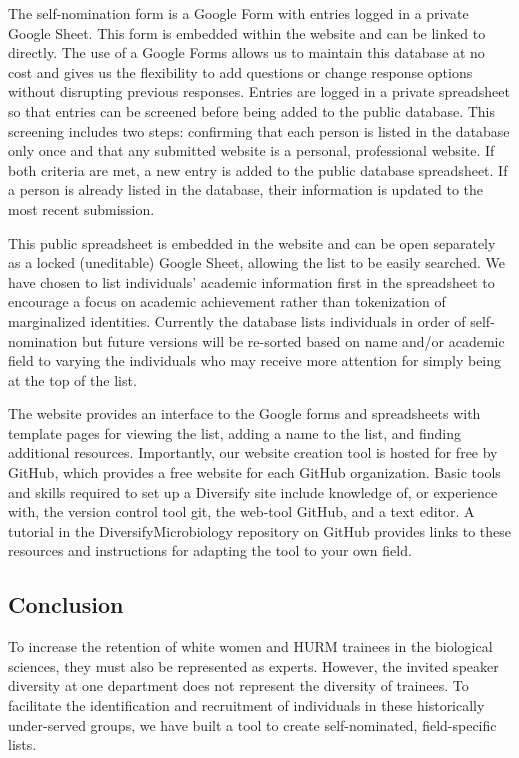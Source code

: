 \documentclass[10pt,]{article}
\begin{document}
The self-nomination form is a Google Form with entries logged in a
private Google Sheet. This form is embedded within the website and can
be linked to directly. The use of a Google Forms allows us to maintain
this database at no cost and gives us the flexibility to add questions
or change response options without disrupting previous responses.
Entries are logged in a private spreadsheet so that entries can be
screened before being added to the public database. This screening
includes two steps: confirming that each person is listed in the
database only once and that any submitted website is a personal,
professional website. If both criteria are met, a new entry is added to
the public database spreadsheet. If a person is already listed in the
database, their information is updated to the most recent submission.

This public spreadsheet is embedded in the website and can be open
separately as a locked (uneditable) Google Sheet, allowing the list to
be easily searched. We have chosen to list individuals' academic
information first in the spreadsheet to encourage a focus on academic
achievement rather than tokenization of marginalized identities.
Currently the database lists individuals in order of self-nomination but
future versions will be re-sorted based on name and/or academic field to
varying the individuals who may receive more attention for simply being
at the top of the list.

The website provides an interface to the Google forms and spreadsheets
with template pages for viewing the list, adding a name to the list, and
finding additional resources. Importantly, our website creation tool is
hosted for free by GitHub, which provides a free website for each GitHub
organization. Basic tools and skills required to set up a Diversify site
include knowledge of, or experience with, the version control tool git,
the web-tool GitHub, and a text editor. A tutorial in the
DiversifyMicrobiology repository on GitHub provides links to these
resources and instructions for adapting the tool to your own field.

\subsection{Conclusion}\label{conclusion}

To increase the retention of white women and HURM trainees in the
biological sciences, they must also be represented as experts. However,
the invited speaker diversity at one department does not represent the
diversity of trainees. To facilitate the identification and recruitment
of individuals in these historically under-served groups, we have built
a tool to create self-nominated, field-specific lists.
\end{document}

